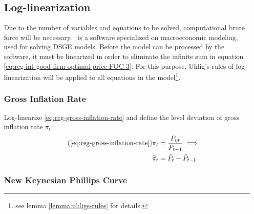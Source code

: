 \documentclass[
	thesis.tex
	]{subfiles}
\begin{document}


\subsection{Log-linearization}

Due to the number of variables and equations to be solved, computational brute force will be necessary. \dynare \ is a software specialized on macroeconomic modeling, used for solving DSGE models. Before the model can be processed by the software, it must be linearized in order to eliminate the infinite sum in equation \ref{eq:reg-int-good-firm-optimal-price-FOC-3}. For this purpose, Uhlig's rules of log-linearization \cite{uhlig_toolkit_1999} will be applied to all equations in the model\footnote{see lemma \ref{lemma:uhligs-rules} for details.}.


\subsubsection{Gross Inflation Rate}

Log-linearize \ref{eq:reg-gross-inflation-rate} and define the level deviation of gross inflation rate $\widetilde{\pi}_t$:
\begin{align}
	\tag{\ref{eq:reg-gross-inflation-rate}}
	\pi_t &= \frac{P_{\eta t}}{P_{t-1}} \implies \\
	\widetilde{\pi}_t &= \hat{P}_t - \hat{P}_{t-1}
	\label{eq:reg-level-dev-gross-inflation-rate}
\end{align}


\subsubsection{New Keynesian Phillips Curve}
\end{document}
